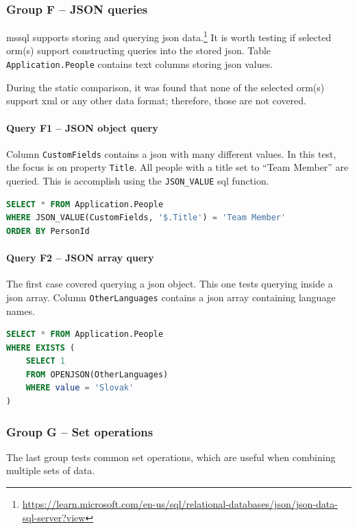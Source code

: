 \subsubsection{Group F -- JSON queries}
\acrshort{mssql} supports storing and querying \acrshort{json} data.\footnote{\url{https://learn.microsoft.com/en-us/sql/relational-databases/json/json-data-sql-server?view}} It is worth testing if selected \acrshort{orm}(s) support constructing queries into the stored \acrshort{json}. Table \texttt{Application.People} contains text columns storing \acrshort{json} values.

During the static comparison, it was found that none of the selected \acrshort{orm}(s) support \acrshort{xml} or any other data format; therefore, those are not covered.

\paragraph{Query F1 -- JSON object query}
\label{query:f1}
Column \texttt{CustomFields} contains a \acrshort{json} with many different values. In this test, the focus is on property \texttt{Title}. All people with a title set to ``Team Member'' are queried. This is accomplish using the \texttt{JSON\_VALUE} \acrshort{sql} function.

\begin{lstlisting}[language=SQL]
SELECT * FROM Application.People
WHERE JSON_VALUE(CustomFields, '$.Title') = 'Team Member'
ORDER BY PersonId
\end{lstlisting}

\paragraph{Query F2 -- JSON array query}
\label{query:f2}
The first case covered querying a \acrshort{json} object. This one tests querying inside a \acrshort{json} array. Column \texttt{OtherLanguages} contains a \acrshort{json} array containing language names.

\begin{lstlisting}[language=SQL]
SELECT * FROM Application.People
WHERE EXISTS (
    SELECT 1
    FROM OPENJSON(OtherLanguages)
    WHERE value = 'Slovak'
)
\end{lstlisting}

\subsubsection{Group G -- Set operations}
The last group tests common set operations, which are useful when combining multiple sets of data.

